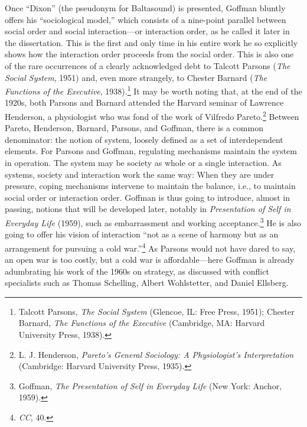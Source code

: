 \documentclass[twoside,symmetric,nobib,justified]{tufte-book}
\begin{document}
Once ``Dixon'' (the pseudonym for Baltasound) is presented, Goffman
bluntly offers his ``sociological model,'' which consists of a
nine-point parallel between social order and social interaction---or
interaction order, as he called it later in the dissertation. This is
the first and only time in his entire work he so explicitly shows how
the interaction order proceeds from the social order. This is also one
of the rare occurrences of a clearly acknowledged debt to Talcott
Parsons (\emph{The Social System}, 1951) and, even more strangely, to
Chester Barnard (\emph{The Functions of the Executive},
1938).\footnote{Talcott Parsons, \emph{The Social System} (Glencoe, IL:
  Free Press, 1951); Chester Barnard, \emph{The Functions of the
  Executive} (Cambridge, MA: Harvard University Press, 1938).} It may be
worth noting that, at the end of the 1920s, both Parsons and Barnard
attended the Harvard seminar of Lawrence Henderson, a physiologist who
was fond of the work of Vilfredo Pareto.\footnote{L. J. Henderson,
  \emph{Pareto's General Sociology: A Physiologist's Interpretation}
  (Cambridge: Harvard University Press, 1935).} Between Pareto,
Henderson, Barnard, Parsons, and Goffman, there is a common denominator:
the notion of system, loosely defined as a set of interdependent
elements. For Parsons and Goffman, regulating mechanisms maintain the
system in operation. The system may be society as whole or a single
interaction. As systems, society and interaction work the same way: When
they are under pressure, coping mechanisms intervene to maintain the
balance, i.e., to maintain social order or interaction order. Goffman is
thus going to introduce, almost in passing, notions that will be
developed later, notably in \emph{Presentation of Self in Everyday Life}
(1959), such as embarrassment and working acceptance.\footnote{Goffman,
  \emph{The Presentation of Self in Everyday Life} (New York: Anchor,
  1959).} He is also going to offer his vision of interaction ``not as a
scene of harmony but as an arrangement for pursuing a cold
war.''\footnote{\emph{CC}, 40.} As Parsons would not have dared to say,
an open war is too costly, but a cold war is affordable---here Goffman
is already adumbrating his work of the 1960s on strategy, as discussed
with conflict specialists such as Thomas Schelling, Albert Wohlstetter,
and Daniel Ellsberg.
\end{document}
